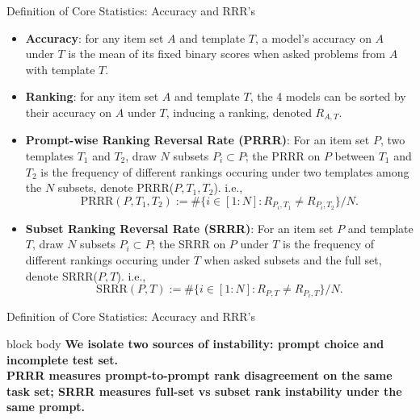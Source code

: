 \documentclass[10pt,aspectratio=169]{beamer}
\newcommand{\insightbox}[1]{
  \begin{beamercolorbox}[rounded=true,shadow=true,sep=0.8em,wd=\linewidth]{block body}
  \centering \large \textbf{#1}
  \end{beamercolorbox}
}
\begin{document}
\begin{frame}{Definition of Core Statistics: Accuracy and RRR's}
	
  \begin{itemize}[<+->]
    \item \textbf{Accuracy}: for any item set $A$ and template $T$, a model's accuracy on $A$ under $T$ is the mean of its fixed binary scores when asked problems from $A$ with template $T$.
    \item \textbf{Ranking}: for any item set $A$ and template $T$, the 4 models can be sorted by their accuracy on $A$ under $T$, inducing a ranking, denoted $R_{A,T}$.
    \item \textbf{Prompt-wise Ranking Reversal Rate (PRRR)}: For an item set $P$, two templates $T_1$ and $T_2$, draw $N$ subsets $P_i \subset P$; the PRRR on $P$ between $T_1$ and $T_2$ is the frequency of different rankings occuring under two templates among the $N$ subsets, denote PRRR($P, T_1, T_2$). i.e.,
    $$ \text{PRRR}(P, T_1, T_2):= \# \{i \in [1:N] : R_{P_i, T_1} \neq R_{P_i, T_2}\} / N.$$
    \item \textbf{Subset Ranking Reversal Rate (SRRR)}: For an item set $P$ and template $T$, draw $N$ subsets $P_i \subset P$; the SRRR on $P$ under $T$ is the frequency of different rankings occuring under $T$ when asked subsets and the full set, denote SRRR($P, T$). i.e.,
    $$\text{SRRR}(P, T) := \# \{i \in [1:N] : R_{P,T} \neq R_{P_i,T}\} / N.$$
  \end{itemize}
\end{frame}

\begin{frame}{Definition of Core Statistics: Accuracy and RRR's}
	\insightbox{We isolate two sources of instability: \textbf{prompt choice} and \textbf{incomplete test set}. \\
	PRRR measures prompt-to-prompt rank disagreement on the same task set; SRRR measures full-set vs subset rank instability under the same prompt.}
	\begin{columns}[T]
	\end{columns}
	
\end{frame}
\end{document}
